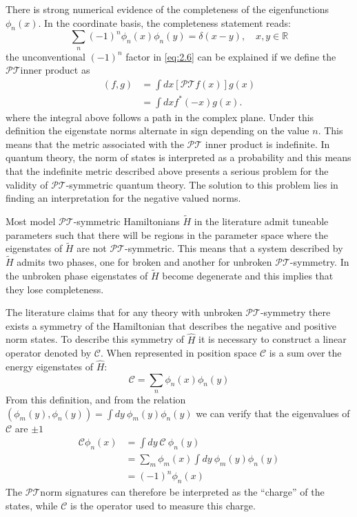 \documentclass[12pt, a4paper]{report}
\newcommand\PT{\(\mathcal{PT}\)}
\newcommand\CC{\(\mathcal{C}\)}
\begin{document}
There is strong numerical evidence of the completeness of the eigenfunctions $\phi_n(x)$\cite{ComplexExtension}\cite{Bender_2004}\cite{Brody_2013}. In the coordinate basis, the completeness statement reads:
\begin{equation}\label{eq:2.6}
\sum_{n}(-1)^{n}\phi_n(x)\phi_n(y) = \delta(x-y),\quad x, y \in \mathbb{R}
\end{equation}
the unconventional $(-1)^n$ factor in \ref{eq:2.6} can be explained if we define the \PT\:inner product as
\begin{align}\label{eq:2.7}
\left ( f, g \right )  & = \int dx \left [ \mathcal{PT} f(x) \right ] g(x)\nonumber\\
                       & = \int dx f^{*}(-x) g(x).
\end{align}
where the integral above follows a path in the complex plane. Under this definition the eigenstate norms alternate in sign depending on the value $n$. This means that the metric associated with the \PT\: inner product is indefinite\cite{Bender_2004}\cite{Critique}.
In quantum theory, the norm of states is interpreted as a probability and this means that the indefinite metric described above presents a serious problem for the validity of \PT-symmetric quantum theory. The solution to this problem lies in finding an interpretation for the negative valued norms\cite{PTsymmetricQM}.

Most model \PT-symmetric Hamiltonians $\tilde{H}$ in the literature admit tuneable parameters such that there will be regions in the parameter space where the eigenstates of $\tilde{H}$ are not \PT-symmetric\cite{Brody_2013}. This means that a system described by $\tilde{H}$ admits two phases, one for broken and another for unbroken \PT-symmetry. In the unbroken phase eigenstates of $\tilde{H}$ become degenerate and this implies that they lose completeness\cite{Brody_2013}. 

The literature claims that for any theory with unbroken \PT-symmetry there exists a symmetry of the Hamiltonian that describes the negative and positive norm states. To describe this symmetry of $\hat{H}$ it is necessary to construct a linear operator denoted by \CC\cite{MustaHbeHermitian}\cite{ComplexExtension}\cite{Bender_2004}. When represented in position space \CC\: is a sum over the energy eigenstates of $\hat{H}$:
\begin{equation}\label{eq:2.8}
\mathcal{C} = \sum_n \phi_n(x)\phi_n(y)
\end{equation}
From this definition, and from the relation $(\phi_m(y), \phi_n(y)) = \int dy\:\phi_m(y)\phi_n(y)$ we can verify that the eigenvalues of \CC\: are $\pm 1$
\begin{align}\label{eq:2.9}
\mathcal{C} \phi_n(x) & = \int dy\:\mathcal{C}\:\phi_n(y)\nonumber \\
& = \sum_{m}\phi_m(x)\int dy\:\phi_m(y) \phi_n(y)\nonumber \\
& = (-1)^n \phi_n(x)
\end{align}
The \PT\:norm signatures can therefore be interpreted as the ``charge'' of the states, while \CC\: is the operator used to measure this charge\cite{Bender_2004}.
\end{document}
